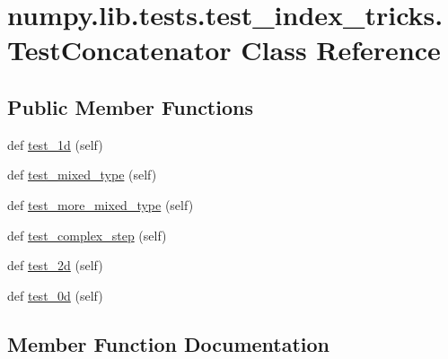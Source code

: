 \hypertarget{classnumpy_1_1lib_1_1tests_1_1test__index__tricks_1_1TestConcatenator}{}\section{numpy.\+lib.\+tests.\+test\+\_\+index\+\_\+tricks.\+Test\+Concatenator Class Reference}
\label{classnumpy_1_1lib_1_1tests_1_1test__index__tricks_1_1TestConcatenator}
\subsection*{Public Member Functions}
\begin{DoxyCompactItemize}
\item 
def \hyperlink{classnumpy_1_1lib_1_1tests_1_1test__index__tricks_1_1TestConcatenator_a6f9ae768d1147d530af48b9a4b36db1a}{test\+\_\+1d} (self)
\item 
def \hyperlink{classnumpy_1_1lib_1_1tests_1_1test__index__tricks_1_1TestConcatenator_aba0eb9cbcfc343a80d0a952c5f7f6277}{test\+\_\+mixed\+\_\+type} (self)
\item 
def \hyperlink{classnumpy_1_1lib_1_1tests_1_1test__index__tricks_1_1TestConcatenator_a6f8f332e500055622cc18c483a43dd3a}{test\+\_\+more\+\_\+mixed\+\_\+type} (self)
\item 
def \hyperlink{classnumpy_1_1lib_1_1tests_1_1test__index__tricks_1_1TestConcatenator_add6c7a9ff0ac94f46f42dd6a43260ed7}{test\+\_\+complex\+\_\+step} (self)
\item 
def \hyperlink{classnumpy_1_1lib_1_1tests_1_1test__index__tricks_1_1TestConcatenator_a3e9d4db75a18388480edd546a0b1606a}{test\+\_\+2d} (self)
\item 
def \hyperlink{classnumpy_1_1lib_1_1tests_1_1test__index__tricks_1_1TestConcatenator_a900219f776dd8b1ed2b6f50d410b3e6a}{test\+\_\+0d} (self)
\end{DoxyCompactItemize}


\subsection{Member Function Documentation}
\mbox{\label{classnumpy_1_1lib_1_1tests_1_1test__index__tricks_1_1TestConcatenator_a900219f776dd8b1ed2b6f50d410b3e6a}} 
